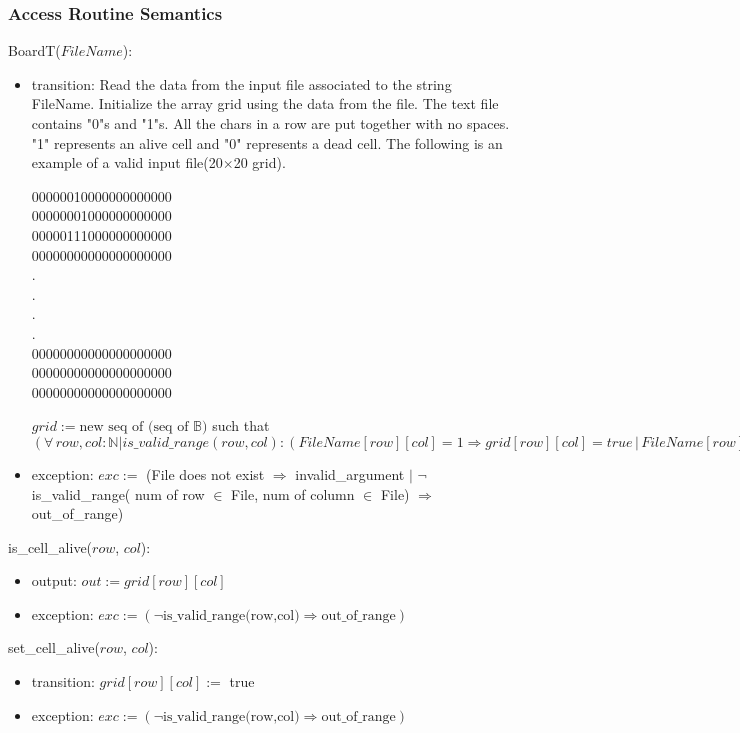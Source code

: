 \documentclass[12pt]{article}
\begin{document}
\subsubsection* {Access Routine Semantics}

\noindent BoardT($\mathit{FileName}$):
\begin{itemize}
\item transition: Read the data from the input file associated to the string FileName. Initialize the array grid using the data from the file. The text file contains "0"s and "1"s. All the chars in a row are put together with no spaces. "1" represents an alive cell and "0" represents a dead cell. 
The following is an example of a valid input file(20$\times$20 grid).
\begin{center}
    00000010000000000000\\
    00000001000000000000\\
    00000111000000000000\\
    00000000000000000000\\
    .\\
    .\\
    .\\
    .\\
    00000000000000000000\\
    00000000000000000000\\
    00000000000000000000\\

\end{center}
$grid := \text{new seq of (seq of } \mathbb{B})$ such that $(\forall \, row,col : \mathbb{N} | is\_valid\_range(row,col) : (FileName[row][col] = 1 \Rightarrow grid[row][col] = true\, |\, FileName[row][col] = 0 \Rightarrow grid[row][col] = false))$
\item exception: $exc :=$ (File does not exist $\Rightarrow$ invalid\_argument $|$ $\lnot$ is\_valid\_range( num of row $\in$ File, num of column $\in$ File) $\Rightarrow$ out\_of\_range)
\end{itemize}

\noindent is\_cell\_alive($row$, $col$):
\begin{itemize}
\item output: $out := grid[row][col]$
\item exception:
  $exc := (\lnot \text{is\_valid\_range(row,col)} \Rightarrow \text{out\_of\_range})$
\end{itemize}

\noindent set\_cell\_alive($row$, $col$):
\begin{itemize}
\item transition: $grid[row][col] :=$ true
\item exception:
  $exc := (\lnot \text{is\_valid\_range(row,col)} \Rightarrow \text{out\_of\_range})$
\end{itemize}
\end{document}
